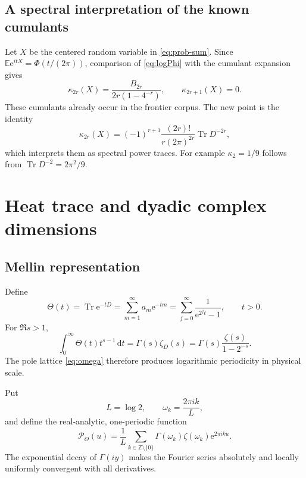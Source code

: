 \documentclass[11pt,oneside]{article}
\numberwithin{equation}{section}
\theoremstyle{plain}
\theoremstyle{definition}
\theoremstyle{remark}
\newcommand{\Tr}{\operatorname{Tr}}
\newcommand{\dd}{\,\mathrm{d}}
\newcommand{\Z}{\mathbb Z}
\newcommand{\Pcal}{\mathcal P}
\newcommand{\e}{\mathrm e}
\begin{document}
\subsection{A spectral interpretation of the known cumulants}

Let $X$ be the centered random variable in \cref{eq:prob-sum}.  Since $\mathbb E\e^{itX}=\Phi(t/(2\pi))$, comparison of \cref{eq:logPhi} with the cumulant expansion gives
\begin{equation}\label{eq:cumulants}
 \kappa_{2r}(X)=\frac{B_{2r}}{2r(1-4^{-r})},
 \qquad
 \kappa_{2r+1}(X)=0.
\end{equation}
These cumulants already occur in the frontier corpus.  The new point is the identity
\begin{equation}\label{eq:cumulant-trace}
 \kappa_{2r}(X)
 =(-1)^{r+1}\frac{(2r)!}{r(2\pi)^{2r}}\Tr D^{-2r},
\end{equation}
which interprets them as spectral power traces.  For example $\kappa_2=1/9$ follows from $\Tr D^{-2}=2\pi^2/9$.

\section{Heat trace and dyadic complex dimensions}

\subsection{Mellin representation}

Define
\begin{equation}\label{eq:Theta}
 \Theta(t)=\Tr\e^{-tD}
 =\sum_{m=1}^{\infty}a_m\e^{-tm}
 =\sum_{j=0}^{\infty}\frac1{\e^{2^jt}-1},
 \qquad t>0.
\end{equation}
For $\Re s>1$,
\begin{equation}\label{eq:Theta-Mellin}
 \int_0^{\infty}\Theta(t)t^{s-1}\dd t
 =\Gamma(s)\zeta_D(s)
 =\Gamma(s)\frac{\zeta(s)}{1-2^{-s}}.
\end{equation}
The pole lattice \cref{eq:omega} therefore produces logarithmic periodicity in physical scale.

Put
\[
 L=\log2,
 \qquad
 \omega_k=\frac{2\pi i k}{L},
\]
and define the real-analytic, one-periodic function
\begin{equation}\label{eq:Ptheta}
 \Pcal_\Theta(u)=\frac1L\sum_{k\in\Z\setminus\{0\}}
 \Gamma(\omega_k)\zeta(\omega_k)\e^{2\pi iku}.
\end{equation}
The exponential decay of $\Gamma(i y)$ makes the Fourier series absolutely and locally uniformly convergent with all derivatives.
\end{document}

